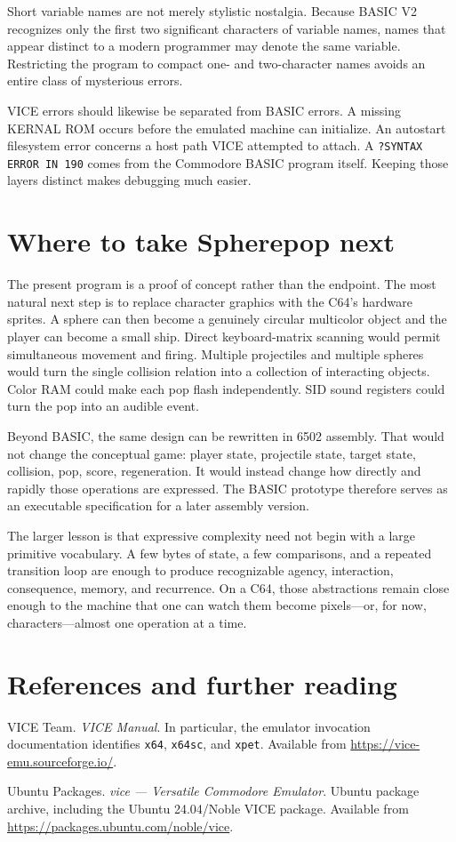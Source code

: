 \documentclass[11pt]{article}
\begin{document}
Short variable names are not merely stylistic nostalgia. Because BASIC V2 recognizes only the first two significant characters of variable names, names that appear distinct to a modern programmer may denote the same variable. Restricting the program to compact one- and two-character names avoids an entire class of mysterious errors.

VICE errors should likewise be separated from BASIC errors. A missing KERNAL ROM occurs before the emulated machine can initialize. An autostart filesystem error concerns a host path VICE attempted to attach. A \texttt{?SYNTAX ERROR IN 190} comes from the Commodore BASIC program itself. Keeping those layers distinct makes debugging much easier.

\section{Where to take Spherepop next}

The present program is a proof of concept rather than the endpoint. The most natural next step is to replace character graphics with the C64's hardware sprites. A sphere can then become a genuinely circular multicolor object and the player can become a small ship. Direct keyboard-matrix scanning would permit simultaneous movement and firing. Multiple projectiles and multiple spheres would turn the single collision relation into a collection of interacting objects. Color RAM could make each pop flash independently. SID sound registers could turn the pop into an audible event.

Beyond BASIC, the same design can be rewritten in 6502 assembly. That would not change the conceptual game: player state, projectile state, target state, collision, pop, score, regeneration. It would instead change how directly and rapidly those operations are expressed. The BASIC prototype therefore serves as an executable specification for a later assembly version.

The larger lesson is that expressive complexity need not begin with a large primitive vocabulary. A few bytes of state, a few comparisons, and a repeated transition loop are enough to produce recognizable agency, interaction, consequence, memory, and recurrence. On a C64, those abstractions remain close enough to the machine that one can watch them become pixels---or, for now, characters---almost one operation at a time.

\section*{References and further reading}

VICE Team. \emph{VICE Manual}. In particular, the emulator invocation documentation identifies \texttt{x64}, \texttt{x64sc}, and \texttt{xpet}. Available from \url{https://vice-emu.sourceforge.io/}.

Ubuntu Packages. \emph{vice --- Versatile Commodore Emulator}. Ubuntu package archive, including the Ubuntu 24.04/Noble VICE package. Available from \url{https://packages.ubuntu.com/noble/vice}.
\end{document}
